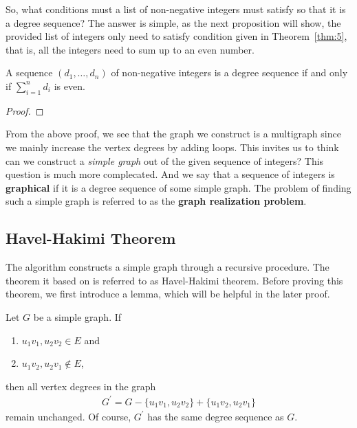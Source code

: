 \documentclass[thmcnt=section, 12pt, color=cyan]{my-elegantbook}
\begin{document}
So, what conditions must a list of non-negative integers
must satisfy so that it is a degree sequence?
The answer is simple,
as the next proposition will show,
the provided list of integers only need to satisfy 
condition given in Theorem~\ref{thm:5}, that is, 
all the integers need to sum up to an even number. 

\begin{proposition} \label{pro:10}
	A sequence $(d_1, \ldots, d_n)$ of non-negative integers
	is a degree sequence if and only if 
	$\sum_{i=1}^n d_i$ is even.
\end{proposition}

\begin{proof}
\end{proof}

From the above proof, we see that
the graph we construct is a multigraph
since we mainly increase the vertex degrees by adding loops.
This invites us to think can we 
construct a \textit{simple graph}
out of the given sequence of integers?
This question is much more complecated.
And we say that a sequence of integers 
is \textbf{graphical}
if it is a degree sequence of some simple graph.
The problem of finding such a simple graph
is referred to as 
the \textbf{graph realization problem}.


\subsection{Havel-Hakimi Theorem}

The algorithm \parencite{hakimiRealizabilitySetIntegers1962}
constructs a simple graph 
through a recursive procedure.
The theorem it based on is referred to 
as Havel-Hakimi theorem.
Before proving this theorem, 
we first introduce a lemma, 
which will be helpful in the later proof.

\begin{lemma} \label{lem:2}
	Let $G$ be a simple graph.
	If
	\begin{enumerate}
		\item $u_1 v_1, u_2 v_2 \in E$ and 
		\item $u_1 v_2, u_2 v_1 \notin E$,
	\end{enumerate}
	then all vertex degrees in the graph
	\begin{align*}
		G^\prime = G - \{u_1 v_1, u_2 v_2\}
		+ \{u_1 v_2, u_2 v_1\}
	\end{align*}
	remain unchanged.
	Of course,
	$G^\prime$ has the same degree sequence as $G$.
\end{lemma}
\end{document}
